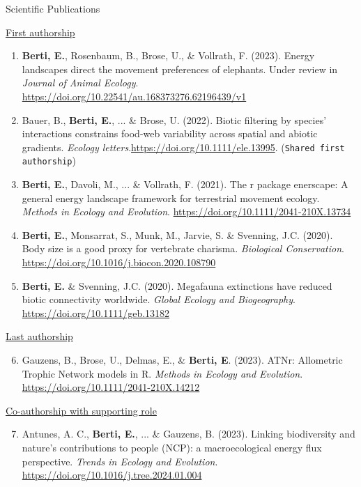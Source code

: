 \documentclass{resume} %
\begin{document}
\clearpage
\begin{rSection}{Scientific Publications}

{\underline{First authorship}}
\begin{enumerate}[leftmargin=0pt]
    \itemsep-1ex
    \item{\textbf{Berti, E.}, Rosenbaum, B., Brose, U., \& Vollrath, F. (2023). Energy landscapes direct the movement preferences of elephants. Under review in \textit{Journal of Animal Ecology}. \url{https://doi.org/10.22541/au.168373276.62196439/v1}}
    \item{Bauer, B., \textbf{Berti, E.}, ... \& Brose, U. (2022). Biotic filtering by species’ interactions constrains food-web variability across spatial and abiotic gradients. \textit{Ecology letters}.\url{https://doi.org/10.1111/ele.13995}. (\texttt{Shared first authorship})}
    \item{\textbf{Berti, E.}, Davoli, M., ... \& Vollrath, F. (2021). The r package enerscape: A general energy landscape framework for terrestrial movement ecology. \textit{Methods in Ecology and Evolution}. \url{https://doi.org/10.1111/2041-210X.13734}}
    \item{\textbf{Berti, E.}, Monsarrat, S., Munk, M., Jarvie, S. \& Svenning, J.C. (2020). Body size is a good proxy for vertebrate charisma. \textit{Biological Conservation}. \url{https://doi.org/10.1016/j.biocon.2020.108790}}
    \item{\textbf{Berti, E.} \& Svenning, J.C. (2020). Megafauna extinctions have reduced biotic connectivity worldwide. \textit{Global Ecology and Biogeography}. \url{https://doi.org/10.1111/geb.13182}}
\end{enumerate}
{\underline{Last authorship}}
\begin{enumerate}[leftmargin=0pt]
    \setcounter{enumi}{5}
    \itemsep-1ex
    \item{Gauzens, B., Brose, U., Delmas, E., \& \textbf{Berti, E}. (2023). ATNr: Allometric Trophic Network models in R. \textit{Methods in Ecology and Evolution}. \url{https://doi.org/10.1111/2041-210X.14212}}
\end{enumerate}
{\underline{Co-authorship with supporting role}}
\begin{enumerate}[leftmargin=0pt]
    \setcounter{enumi}{6}
    \itemsep-1ex
    \item Antunes, A. C., \textbf{Berti, E.}, ... \& Gauzens, B. (2023). Linking biodiversity and nature’s contributions to people (NCP): a macroecological energy flux perspective. \textit{Trends in Ecology and Evolution}. \url{https://doi.org/10.1016/j.tree.2024.01.004}

\end{enumerate}
\end{rSection}
\end{document}
